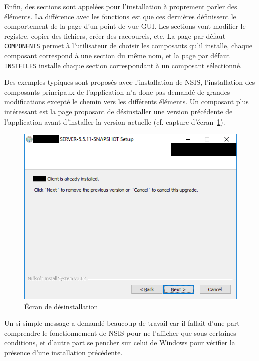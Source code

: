 Enfin, des sections sont appelées pour l'installation à proprement parler des éléments. La différence avec les fonctions est que ces dernières définissent le comportement de la page d'un point de vue GUI. Les sections vont modifier le registre, copier des fichiers, créer des raccourcis, etc. La page par défaut \verb|COMPONENTS| permet à l'utilisateur de choisir les composants qu'il installe, chaque composant correspond à une section du même nom, et la page par défaut \verb|INSTFILES| installe chaque section correspondant à un composant sélectionné. 

Des exemples typiques sont proposés avec l'installation de NSIS, l'installation des composants principaux de l'application n'a donc pas demandé de grandes modifications excepté le chemin vers les différents éléments. Un composant plus intéressant est la page proposant de désinstaller une version précédente de l'application avant d'installer la version actuelle (cf. capture d'écran~\ref{fig:nsis_unins}).

\begin{figure}
    \centering
    \caption{Écran de désinstallation}
	\label{fig:nsis_unins}
    \includegraphics[width=\textwidth]{images/nsis_uninstall}
\end{figure}

Un si simple message a demandé beaucoup de travail car il fallait d'une part comprendre le fonctionnement de NSIS pour ne l'afficher que sous certaines conditions, et d'autre part se pencher sur celui de Windows pour vérifier la présence d'une installation précédente.

